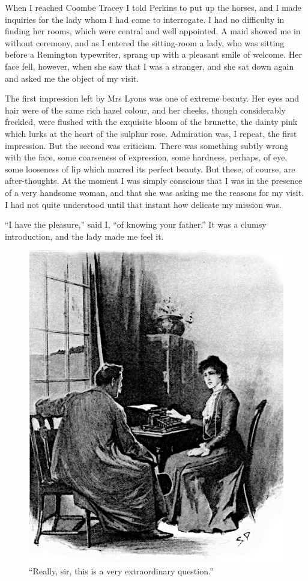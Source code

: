 \documentclass[paper=5.5in:8.5in,BCOR=7mm,twoside,DIV=calc,12pt,usegeometry,openany,chapterprefix,endperiod,headings=big]{scrbook} %
\begin{document}
When I reached Coombe Tracey I told Perkins to put up the horses, and I made inquiries for the lady whom I had come to interrogate. I had no difficulty in finding her rooms, which were central and well appointed. A maid showed me in without ceremony, and as I entered the sitting-room a lady, who was sitting before a Remington typewriter, sprang up with a pleasant smile of welcome. Her face fell, however, when she saw that I was a stranger, and she sat down again and asked me the object of my visit.

The first impression left by Mrs Lyons was one of extreme beauty. Her eyes and hair were of the same rich hazel colour, and her cheeks, though considerably freckled, were flushed with the exquisite bloom of the brunette, the dainty pink which lurks at the heart of the sulphur rose. Admiration was, I repeat, the first impression. But the second was criticism. There was something subtly wrong with the face, some coarseness of expression, some hardness, perhaps, of eye, some looseness of lip which marred its perfect beauty. But these, of course, are after-thoughts. At the moment I was simply conscious that I was in the presence of a very handsome woman, and that she was asking me the reasons for my visit. I had not quite understood until that instant how delicate my mission was.

\enquote{I have the pleasure,} said I, \enquote{of knowing your father.} It was a clumsy introduction, and the lady made me feel it.

\begin{figure}[tbph]
\centering
\includegraphics[width=\linewidth]{10_extraordinary}
\caption{\enquote{Really, sir, this is a very extraordinary question.}}
\end{figure}
\end{document}
